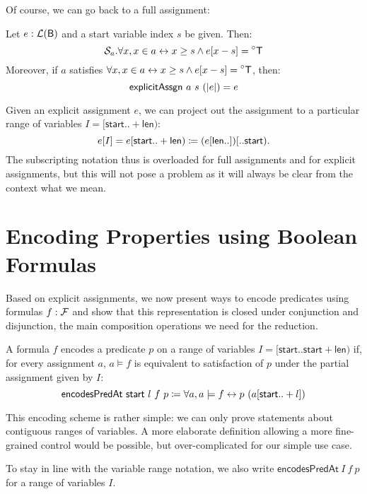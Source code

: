 \newcommand{\expandA}{\textsf{expandAssgn}}
Of course, we can go back to a full assignment: 
\begin{proposition} 
  Let $e : \mathcal{L} (\textsf{B})$ and a start variable index $s$ be given. Then:
  \[\sigtype{a}. \forall x, x \in a \leftrightarrow x \ge s \land e[x-s] = \OSome{\btrue} \]
  Moreover, if $a$ satisfies $\forall x, x \in a \leftrightarrow x \ge s \land e[x-s] = \OSome{\btrue}$, then:
  \[\textsf{explicitAssgn}~a~s~(|e|) = e \]
\end{proposition}

\newcommand{\projVars}{\textsf{projVars}}
Given an explicit assignment $e$, we can project out the assignment to a particular range of variables $I = [\textsf{start}.. +\textsf{len})$:
\[e[I] = e[\textsf{start}..+\textsf{len}) \coloneqq (e[\textsf{len} ..])[.. \textsf{start}).\] 
The subscripting notation thus is overloaded for full assignments and for explicit assignments, but this will not pose a problem as it will always be clear from the context what we mean.

\section{Encoding Properties using Boolean Formulas}
Based on explicit assignments, we now present ways to encode predicates using formulas $f : \mathcal{F}$ and show that this representation is closed under conjunction and disjunction, the main composition operations we need for the reduction.

\newcommand{\encodesPred}{\textsf{encodesPredAt}}
\begin{definition}
  \mnote{\encodesPred}
  A formula $f$ encodes a predicate $p$ on a range of variables $I = [\textsf{start}.. \textsf{start} + \textsf{len})$ if, for every assignment $a$, $a \models f$ is equivalent to satisfaction of $p$ under the partial assignment given by $I$:
  \[\encodesPred~\textsf{start}~l~f~p \defeq \forall a, a \models f \leftrightarrow p~(a[\textsf{start}.. + l]) \]
\end{definition}

This encoding scheme is rather simple: we can only prove statements about contiguous ranges of variables. 
A more elaborate definition allowing a more fine-grained control would be possible, but over-complicated for our simple use case.

To stay in line with the variable range notation, we also write $\encodesPred~I~f~p$ for a range of variables $I$.

